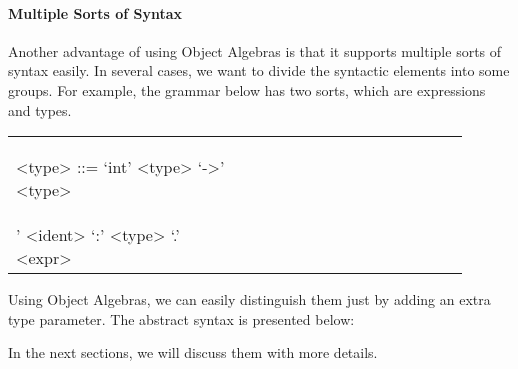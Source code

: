 

\paragraph{Multiple Sorts of Syntax} Another advantage of using Object Algebras is that it supports multiple sorts of syntax easily. In several cases, we want to divide the syntactic elements into some groups. For example, the grammar below has two sorts, which are expressions and types.

\begin{tabular}{m{0.45\linewidth}m{0.45\linewidth}}
\setlength{\grammarindent}{5em}
\begin{grammar}
<type> ::= `int' \alt <type> `->' <type>
\end{grammar}
&
\setlength{\grammarindent}{5em}
\begin{grammar}
<expr> ::=  `\\' <ident> `:' <type> `.' <expr>
\end{grammar}
\end{tabular}

Using Object Algebras, we can easily distinguish them just by adding an extra type parameter. The abstract syntax is
presented below:

In the next sections, we will discuss them with more details.
